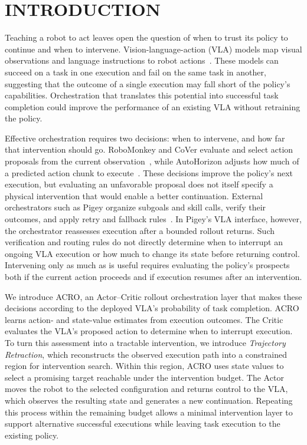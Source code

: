\section{INTRODUCTION}

\afterpage{}

Teaching a robot to act leaves open the question of when to trust its policy to continue and when to intervene. Vision-language-action (VLA) models map visual observations and language instructions to robot actions~\citep{zitkovich2023rt2,kim2025openvla,black2025pi0}. These models can succeed on a task in one execution and fail on the same task in another, suggesting that the outcome of a single execution may fall short of the policy's capabilities. Orchestration that translates this potential into successful task completion could improve the performance of an existing VLA without retraining the policy.


Effective orchestration requires two decisions: when to intervene, and how far that intervention should go. RoboMonkey and CoVer evaluate and select action proposals from the current observation~\citep{kwok2025robomonkey,kwok2026cover}, while AutoHorizon adjusts how much of a predicted action chunk to execute~\citep{wang2026autohorizon}. These decisions improve the policy's next execution, but evaluating an unfavorable proposal does not itself specify a physical intervention that would enable a better continuation. External orchestrators such as Pigey organize subgoals and skill calls, verify their outcomes, and apply retry and fallback rules~\citep{galanti2026pigey}. In Pigey's VLA interface, however, the orchestrator reassesses execution after a bounded rollout returns. Such verification and routing rules do not directly determine when to interrupt an ongoing VLA execution or how much to change its state before returning control. Intervening only as much as is useful requires evaluating the policy's prospects both if the current action proceeds and if execution resumes after an intervention.

We introduce ACRO, an Actor--Critic rollout orchestration layer that makes these decisions according to the deployed VLA's probability of task completion. ACRO learns action- and state-value estimates from execution outcomes. The Critic evaluates the VLA's proposed action to determine when to interrupt execution. To turn this assessment into a tractable intervention, we introduce \emph{Trajectory Retraction}, which reconstructs the observed execution path into a constrained region for intervention search. Within this region, ACRO uses state values to select a promising target reachable under the intervention budget. The Actor moves the robot to the selected configuration and returns control to the VLA, which observes the resulting state and generates a new continuation. Repeating this process within the remaining budget allows a minimal intervention layer to support alternative successful executions while leaving task execution to the existing policy.


